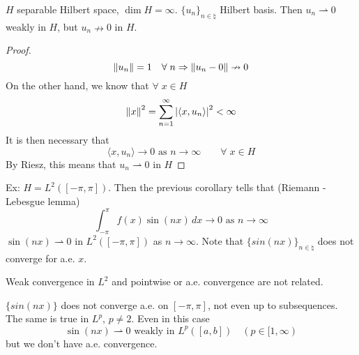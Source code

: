\begin{corollary}
    \(H\) separable Hilbert space, \(\dim H = \infty\). \(\{u_n\}_{n \in \natural}\) Hilbert basis. Then \(u_n \rightharpoonup 0\) weakly in \(H\), but \(u_n \nrightarrow 0\) in \(H\).
\end{corollary}
\begin{proof}
    \[
        \norm{u_n}=1 \quad \forall\; n \Rightarrow \norm{u_n -0} \nrightarrow 0 
    \]
    On the other hand, we know that \(\forall \; x \in H\)
    \[
        \norm{x}^2 = \sum_{n=1}^\infty \abs{\langle x, u_n\rangle  }^2 < \infty
    \]
    It is then necessary that
    \[
        \langle x, u_n\rangle   \to 0 \text{ as } n \to \infty \qquad \forall\; x \in H
    \]
    By Riesz, this means that \(u_n \rightharpoonup 0\) in \(H\)
\end{proof}

Ex: \(H = L^2([-\pi, \pi])\). Then the previous corollary tells that (Riemann - Lebesgue lemma)
\[
    \int_{-\pi}^\pi f(x) \sin (nx) \, dx \to 0 \text{ as } n \to \infty
\]                
\(\sin(nx) \rightharpoonup 0\) in \(L^2([-\pi, \pi])\) as \(n \to \infty\). Note that \(\{sin(nx)\}_{n \in \natural}\) does not converge for a.e. \(x\).

Weak convergence in \(L^2\) and pointwise or a.e. convergence are not related.

\(\{sin(nx)\}\) does not converge a.e. on \([-\pi, \pi]\), not even up to subsequences. 
The same is true in \(L^p\), \(p \neq 2\). Even in this case
\[
    \sin(nx) \rightharpoonup 0 \text{ weakly in } L^p([a,b]) \quad (p \in [1, \infty)
\] 
but we don't have a.e. convergence.